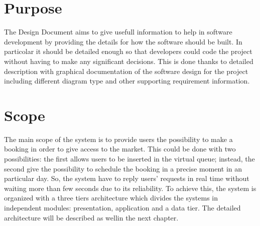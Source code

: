 \section{Purpose}
The Design Document aims to give usefull information to help in software development by providing the details for how the software should be built. In particolar it should be detailed enough so that developers could code the project without having to make any significant decisions. This is done thanks to detailed description with graphical documentation of the software design for the project including different diagram type and other supporting requirement information.
\section{Scope}
The main scope of the system is to provide users the possibility to make a booking in order to give access to the market. This could be done with two possibilities: the first allows users to be inserted in the virtual queue; instead, the second give the possibility to schedule the booking in a precise moment in an particular day. 
So, the system have to reply users' requests in real time without waiting more than few seconds due to its reliability. 
To achieve this, the system is organized with a three tiers architecture which divides the systems in independent modules: presentation, application and a data tier. The detailed architecture will be described as wellin the next chapter.

\begin{comment}
in which a presentation layer runs on a client, and a data and application layers get stored on a server. [TODO]
The client side in particolar is composed by two different applications with the same functionalites:
\begin{itemize}
\item \textbf{CLup}: It's the application used by users who have a smartphone. They can manage their booking by themselves;
\item \textbf{CLup Operator}: It's the application used by receptionists who act as an intermediary to manage booking of users that have only a mobilephone.
\end{itemize}

Instead the server side contains:

\begin{itemize}
\item \textbf{Application layer}: it accounts for managing the users' entrances and for a proper operation of the system;
\item \textbf{Data layer}: it stores information and personal data of each users;
\end{itemize}

\end{comment}

